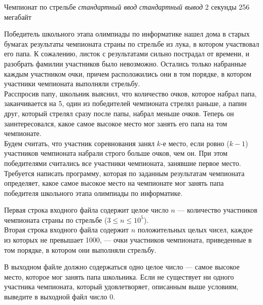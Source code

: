 \begin{problem}%
{Чемпионат по стрельбе}%
{\textsl{стандартный ввод}}%
{\textsl{стандартный вывод}}%
{2 секунды}%
{256 мегабайт}{}

Победитель школьного этапа олимпиады по информатике нашел дома в старых бумагах результаты чемпионата страны по стрельбе из лука, в котором участвовал его папа. К сожалению, листок с результатами сильно пострадал от времени, и разобрать фамилии участников было невозможно. Остались только набранные каждым участником очки, причем расположились они в том порядке, в котором участники чемпионата выполняли стрельбу.\\

Расспросив папу, школьник выяснил, что количество очков, которое набрал папа, заканчивается на 5, один из победителей чемпионата стрелял раньше, а папин друг, который стрелял сразу после папы, набрал меньше очков. Теперь он заинтересовался, какое самое высокое место мог занять его папа на том чемпионате.\\

Будем считать, что участник соревнования занял $k$-е место, если ровно ($k - 1$)  участников чемпионата набрали строго больше очков, чем он. При этом победителями считались все участники чемпионата, занявшие первое место.\\

Требуется написать программу, которая по заданным результатам чемпионата определяет, какое самое высокое место на чемпионате мог занять папа победителя школьного этапа олимпиады по информатике.

\InputFile

Первая строка входного файла содержит целое число $n$ — количество участников чемпионата страны по стрельбе ($3 \le n \le 10^5$).\\

Вторая строка входного файла содержит $n$ положительных целых чисел, каждое из которых не превышает 1000, — очки участников чемпионата, приведенные в том порядке, в котором они выполняли стрельбу.

\OutputFile

В выходном файле должно содержаться одно целое число — самое высокое место, которое мог занять папа школьника. Если не существует ни одного участника чемпионата, который удовлетворяет, описанным выше условиям, выведите в выходной файл число 0.

\Examples

\begin{example}
%
%
\end{example}
\end{problem}